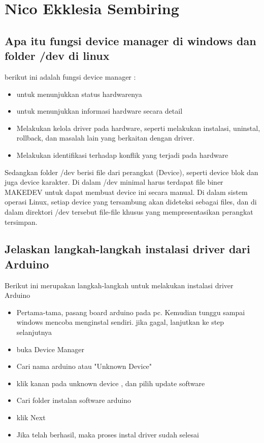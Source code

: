 \section{Nico Ekklesia Sembiring}
\subsection{Apa itu fungsi device manager di windows dan folder /dev di linux}
berikut ini adalah fungsi device manager :
\begin{itemize}
	\item untuk menunjukkan status hardwarenya
	\item untuk menunjukkan informasi hardware secara detail
	\item Melakukan kelola driver pada hardware, seperti melakukan instalasi, uninstal, rollback, dan masalah lain yang berkaitan dengan driver.
	\item Melakukan identifikasi terhadap konflik yang terjadi pada hardware
\end{itemize}

Sedangkan folder /dev berisi file dari perangkat (Device), seperti device blok dan juga device karakter. Di dalam /dev minimal harus terdapat file biner MAKEDEV untuk dapat membuat device ini secara manual.
Di dalam sistem operasi Linux, setiap device yang tersambung akan dideteksi sebagai files, dan di dalam direktori /dev tersebut file-file khusus yang mempresentasikan perangkat tersimpan.

\subsection{Jelaskan langkah-langkah instalasi driver dari Arduino}
Berikut ini merupakan langkah-langkah untuk melakukan instalasi driver Arduino
\begin{itemize}
	\item Pertama-tama, pasang board arduino pada pc. Kemudian tunggu sampai windows mencoba menginstal sendiri. jika gagal, lanjutkan ke step selanjutnya
	\item buka Device Manager 
	\item Cari nama arduino atau "Unknown Device"
	\item klik kanan pada unknown device , dan pilih update software
	\item Cari folder instalan software arduino
	\item klik Next
	\item Jika telah berhasil, maka proses instal driver sudah selesai
\end{itemize}

